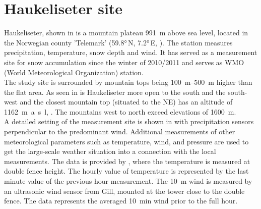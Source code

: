 \section{Haukeliseter site}\label{sec:dim:site}

Haukeliseter, shown in  is a mountain plateau \SI{991}{\m} above sea level, located in the Norwegian county 'Telemark' (\ang{59.8}\,N, \ang{7.2}\,E, ). The station measures precipitation, temperature, snow depth and wind. It has served as a measurement site for snow accumulation since the winter of 2010/2011 \citep{wolff_new_2010, wolff_measurements_2013, wolff_derivation_2015} and serves as WMO (World Meteorological Organization) station. \\
The study site is surrounded by mountain tops being \SIrange{100}{500}{\metre} higher than the flat area. As seen in  is Haukeliseter more open to the south and the south-west and the closest mountain top (situated to the NE) has an altitude of \SI{1162}{\metre a.s.l},  \citep{wolff_derivation_2015}. The mountains west to north exceed elevations of \SI{1600}{\metre}.
\\
A detailed setting of the measurement site is shown in  with precipitation sensors perpendicular to the predominant wind. Additional measurements of other meteorological parameters such as temperature, wind, and pressure are used to get the large-scale weather situation into a connection with the local measurements. The data is provided by \citet{eklima_norwegian_2016}, where the temperature is measured at double fence height. The hourly value of temperature is represented by the last minute value of the previous hour measurement. The \SI{10}{\metre} wind is measured by an ultrasonic wind sensor from Gill, mounted at the tower close to the double fence. The data represents the averaged \SI{10}{\minute} wind prior to the full hour.
